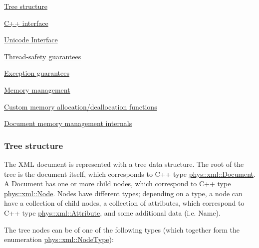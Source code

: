 \begin{DoxyItemize}
\item \hyperlink{XMLManual_XMLTreeStructure}{Tree structure}
\item \hyperlink{XMLManual_XMLInterface}{C++ interface}
\item \hyperlink{XMLManual_XMLUnicode}{Unicode Interface}
\item \hyperlink{XMLManual_XMLThreadSafety}{Thread-\/safety guarantees}
\item \hyperlink{XMLManual_XMLExceptionSafety}{Exception guarantees}
\item \hyperlink{XMLManual_XMLMemory}{Memory management}
\begin{DoxyItemize}
\item \hyperlink{XMLManual_XMLCustomAlloc}{Custom memory allocation/deallocation functions}
\item \hyperlink{XMLManual_XMLMemoryInternals}{Document memory management internals} 
\end{DoxyItemize}
\end{DoxyItemize}\hypertarget{XMLManual_XMLTreeStructure}{}\subsubsection{Tree structure}\label{XMLManual_XMLTreeStructure}
The XML document is represented with a tree data structure. The root of the tree is the document itself, which corresponds to C++ type \hyperlink{classphys_1_1xml_1_1Document}{phys::xml::Document}. A Document has one or more child nodes, which correspond to C++ type \hyperlink{classphys_1_1xml_1_1Node}{phys::xml::Node}. Nodes have different types; depending on a type, a node can have a collection of child nodes, a collection of attributes, which correspond to C++ type \hyperlink{classphys_1_1xml_1_1Attribute}{phys::xml::Attribute}, and some additional data (i.e. Name). \par
 \par
 The tree nodes can be of one of the following types (which together form the enumeration \hyperlink{namespacephys_1_1xml_a668b0cc666a9d49f7c7222a7552115d3}{phys::xml::NodeType}):
